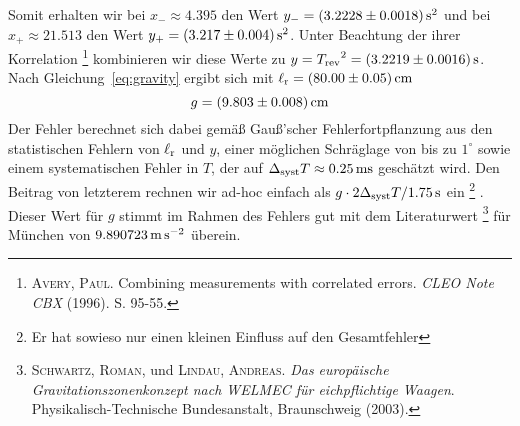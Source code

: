 Somit erhalten wir bei $x_- \approx 4.395$ den Wert $y_- = \unit[(3.2228 \pm 0.0018)]{s^2}$ und bei $x_+ \approx 21.513$ den Wert $y_+ = \unit[(3.217 \pm 0.004)]{s^2}$. Unter Beachtung der ihrer Korrelation%
\footnote{\textsc{Avery, Paul}. Combining measurements with correlated errors. \textit{CLEO Note CBX} (1996). S. 95-55.}
kombinieren wir diese Werte zu $y = {T_\mathrm{rev}}^2 = \unit[(3.2219 \pm 0.0016)]{s}$.
Nach Gleichung~\ref{eq:gravity} ergibt sich mit $\l_\mathrm{r} = \unit[(80.00 \pm 0.05)]{cm}$
\[
    g = \unit[(9.803 \pm 0.008)]{cm}
\]
Der Fehler berechnet sich dabei gemäß Gauß'scher Fehlerfortpflanzung aus den statistischen Fehlern von $\ell_\mathrm{r}$ und $y$, einer möglichen Schräglage von bis zu $1^\circ$ sowie einem systematischen Fehler in $T$, der auf $\Delta_\mathrm{syst} T \approx \unit[0.25]{ms}$ geschätzt wird. Den Beitrag von letzterem rechnen wir ad-hoc einfach als $g \cdot 2 \Delta_\mathrm{syst} T / \unit[1.75]{s}$ ein%
\footnote{Er hat sowieso nur einen kleinen Einfluss auf den Gesamtfehler}%
. Dieser Wert für $g$ stimmt im Rahmen des Fehlers gut mit dem Literaturwert%
\footnote{\textsc{Schwartz, Roman}, und \textsc{Lindau, Andreas}. \textit{Das europäische Gravitationszonenkonzept nach WELMEC für eichpflichtige Waagen}. Physikalisch-Technische Bundesanstalt, Braunschweig (2003).}
für München von $\unit[9.890723]{m\,s^{-2}}$ überein.

